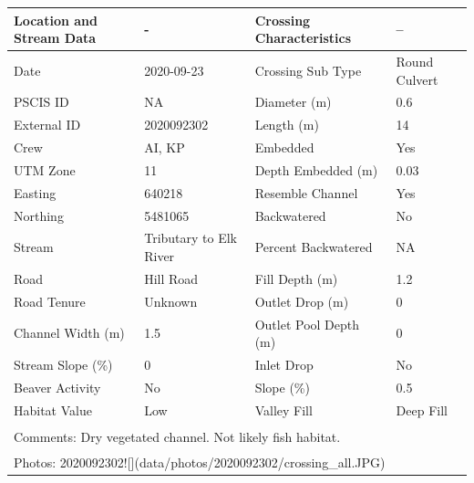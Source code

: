 \documentclass[
]{book}
\begin{document}
\begin{tabular}{llll}
\toprule
Location and Stream Data & - & Crossing Characteristics & --\\
\midrule
Date & 2020-09-23 & Crossing Sub Type & Round Culvert\\
PSCIS ID & NA & Diameter (m) & 0.6\\
External ID & 2020092302 & Length (m) & 14\\
Crew & AI, KP & Embedded & Yes\\
UTM Zone & 11 & Depth Embedded (m) & 0.03\\
\addlinespace
Easting & 640218 & Resemble Channel & Yes\\
Northing & 5481065 & Backwatered & No\\
Stream & Tributary to Elk River & Percent Backwatered & NA\\
Road & Hill Road & Fill Depth (m) & 1.2\\
Road Tenure & Unknown & Outlet Drop (m) & 0\\
\addlinespace
Channel Width (m) & 1.5 & Outlet Pool Depth (m) & 0\\
Stream Slope (\%) & 0 & Inlet Drop & No\\
Beaver Activity & No & Slope (\%) & 0.5\\
Habitat Value & Low & Valley Fill & Deep Fill\\
\bottomrule
\multicolumn{4}{l}{\textsuperscript{} Comments: Dry vegetated channel. Not likely fish habitat.}\\
\multicolumn{4}{l}{\textsuperscript{} Photos: 2020092302![](data/photos/2020092302/crossing\_all.JPG)}\\
\end{tabular}
\end{document}
